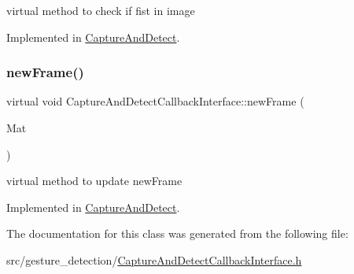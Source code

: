 virtual method to check if fist in image 



Implemented in \hyperlink{classCaptureAndDetect_a1620075ba1bf4d52a4e455c20f7ac3d1}{Capture\+And\+Detect}.

\mbox{\label{classCaptureAndDetectCallbackInterface_ae833754fc1c2bb1450e958ef619e9153}} 
\subsubsection{\texorpdfstring{new\+Frame()}{newFrame()}}
{\footnotesize\ttfamily virtual void Capture\+And\+Detect\+Callback\+Interface\+::new\+Frame (\begin{DoxyParamCaption}\item[{Mat}]{ }\end{DoxyParamCaption})\hspace{0.3cm}{\ttfamily [pure virtual]}}



virtual method to update new\+Frame 



Implemented in \hyperlink{classCaptureAndDetect_a7f18d1c58b2ae4241766b36aa27385e9}{Capture\+And\+Detect}.



The documentation for this class was generated from the following file\+:\begin{DoxyCompactItemize}
\item 
src/gesture\+\_\+detection/\hyperlink{CaptureAndDetectCallbackInterface_8h}{Capture\+And\+Detect\+Callback\+Interface.\+h}\end{DoxyCompactItemize}
